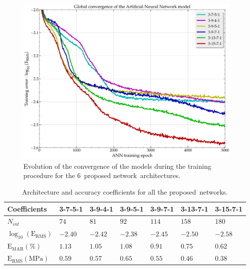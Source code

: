 \documentclass[metals,article,accept,pdftex,moreauthors]{Definitions/mdpi}
\DeclareRobustCommand{\RMSE}{\text{E}_\text{RMS}}
\DeclareRobustCommand{\MARE}{\text{E}_\text{MAR}}
\DeclareRobustCommand{\MPa}{\text{MPa}}
\begin{document}
\begin{figure}[H]
\centering
\includegraphics[width=0.75\columnwidth]{Figures/Conv-ANN-6}
\caption{Evolution of the convergence of the models during the training procedure for the \mbox{6 proposed} network~architectures.}
\label{fig:ANN-conv}
\end{figure}
\unskip

\begin{table}[H]
\caption{Architecture and accuracy coefficients for all the proposed~networks.}
\begin{tabularx}{\textwidth}{LCCCCCC}
\toprule
\textbf{Coefficients} & \textbf{3-7-5-1} & \textbf{3-9-4-1} & \textbf{3-9-5-1} & \textbf{3-9-7-1} & \textbf{3-13-7-1} & \textbf{3-15-7-1} \\
\midrule
$N_{int}$ & $74$ & $81$ & $92$ & $114$ & $158$ &$180$\\
\midrule
$\log_{10}(\RMSE)$ & $-2.40$ & $-2.42$ & $-2.38$ & $-2.45$ & $-2.50$ & $-2.58$ \\
$\MARE(\%)$ & $1.13$ & $1.05$ & $1.08$ & $0.91$ & $0.75$ & $0.62$ \\
$\RMSE(\MPa)$ & $0.59$ & $0.57$ & $0.65$ & $0.55$ & $0.46$ & $0.38$ \\
\bottomrule
\end{tabularx}
\label{tab:Errors}
\end{table}
\unskip
\end{document}
